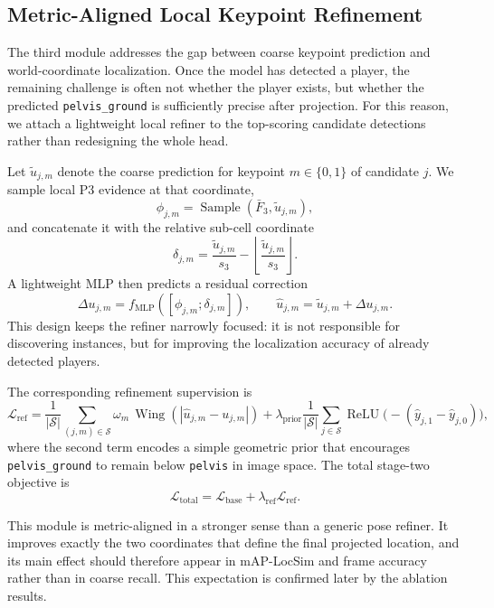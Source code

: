 \documentclass[runningheads]{llncs}
\begin{document}
\subsection{Metric-Aligned Local Keypoint Refinement}
\label{sec:local-refine}

The third module addresses the gap between coarse keypoint prediction and world-coordinate localization. Once the model has detected a player, the remaining challenge is often not whether the player exists, but whether the predicted \texttt{pelvis\_ground} is sufficiently precise after projection. For this reason, we attach a lightweight local refiner to the top-scoring candidate detections rather than redesigning the whole head.

Let $\tilde{u}_{j,m}$ denote the coarse prediction for keypoint $m \in \{0,1\}$ of candidate $j$. We sample local P3 evidence at that coordinate,
\[
\phi_{j,m}=\operatorname{Sample}(\bar{F}_3,\tilde{u}_{j,m}),
\]
and concatenate it with the relative sub-cell coordinate
\[
\delta_{j,m}=\frac{\tilde{u}_{j,m}}{s_3}-\left\lfloor\frac{\tilde{u}_{j,m}}{s_3}\right\rfloor.
\]
A lightweight MLP then predicts a residual correction
\[
\Delta u_{j,m}=f_{\text{MLP}}([\phi_{j,m};\delta_{j,m}]), \qquad
\hat{u}_{j,m}=\tilde{u}_{j,m}+\Delta u_{j,m}.
\]
This design keeps the refiner narrowly focused: it is not responsible for discovering instances, but for improving the localization accuracy of already detected players.

The corresponding refinement supervision is
\begin{equation}
\mathcal{L}_{\text{ref}}=
\frac{1}{|\mathcal{S}|}\sum_{(j,m)\in\mathcal{S}} \omega_m\,\operatorname{Wing}\!\left(|\hat{u}_{j,m}-u_{j,m}|\right)
+ \lambda_{\text{prior}} \frac{1}{|\mathcal{S}|}\sum_{j\in\mathcal{S}} \operatorname{ReLU}\!\bigl(-(\hat{y}_{j,1}-\hat{y}_{j,0})\bigr),
\label{eq:ref-loss}
\end{equation}
where the second term encodes a simple geometric prior that encourages \texttt{pelvis\_ground} to remain below \texttt{pelvis} in image space. The total stage-two objective is
\[
\mathcal{L}_{\text{total}}=\mathcal{L}_{\text{base}}+\lambda_{\text{ref}}\mathcal{L}_{\text{ref}}.
\]

This module is metric-aligned in a stronger sense than a generic pose refiner. It improves exactly the two coordinates that define the final projected location, and its main effect should therefore appear in mAP-LocSim and frame accuracy rather than in coarse recall. This expectation is confirmed later by the ablation results.
\end{document}
